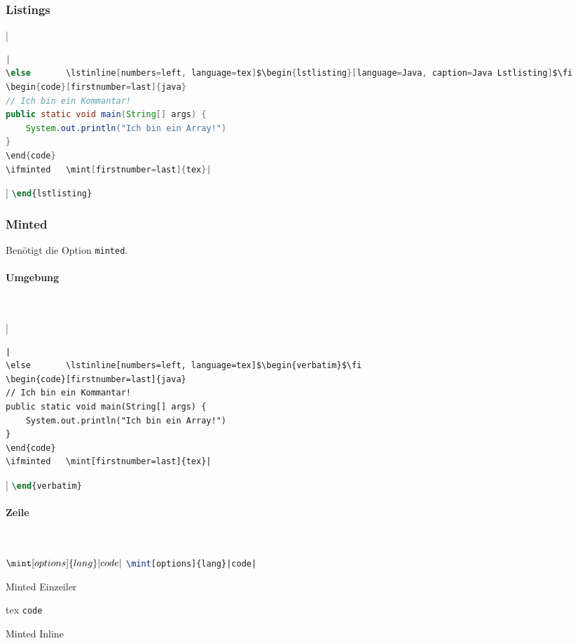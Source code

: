 \subsubsection{Listings}
\begin{listing}
\ifminted   {}|\begin{lstlisting}[language=Java, caption=Java Lstlisting]|
\else       \lstinline[numbers=left, language=tex]$\begin{lstlisting}[language=Java, caption=Java Lstlisting]$\fi
\begin{code}[firstnumber=last]{java}
// Ich bin ein Kommantar!
public static void main(String[] args) {
    System.out.println("Ich bin ein Array!")
}
\end{code}
\ifminted   \mint[firstnumber=last]{tex}|\end{lstlisting}|
\else       \lstinline[firstnumber=last, numbers=left, language=tex]$\end{lstlisting}$\fi
\caption{Java Lstlisting}
\label{lst:java-lstlisting}
\end{listing}

\newpage
\subsubsection{Minted}
Benötigt die Option \texttt{minted}.
\paragraph{Umgebung}~\\
\begin{listing}
\ifminted   {}|\begin{verbatim}|
\else       \lstinline[numbers=left, language=tex]$\begin{verbatim}$\fi
\begin{code}[firstnumber=last]{java}
// Ich bin ein Kommantar!
public static void main(String[] args) {
    System.out.println("Ich bin ein Array!")
}
\end{code}
\ifminted   \mint[firstnumber=last]{tex}|\end{verbatim}|
\else       \lstinline[firstnumber=last, numbers=left, language=tex]$\end{verbatim}$\fi
\caption{Minted Umgebung}
\label{lst:minted-env}
\end{listing}

\paragraph{Zeile}~\\
\begin{listing}
\ifminted   {}$\mint[options]{lang}|code|$
\else       \lstinline[language=tex]$\mint[options]{lang}|code|$\fi
\caption{Minted Einzeiler}
\label{lst:minted-line}
\end{listing}

\begin{listing}
\begin{code}{tex}
\texttt{code}
\end{code}
\caption{Minted Inline}
\label{lst:minted-inline}
\end{listing}